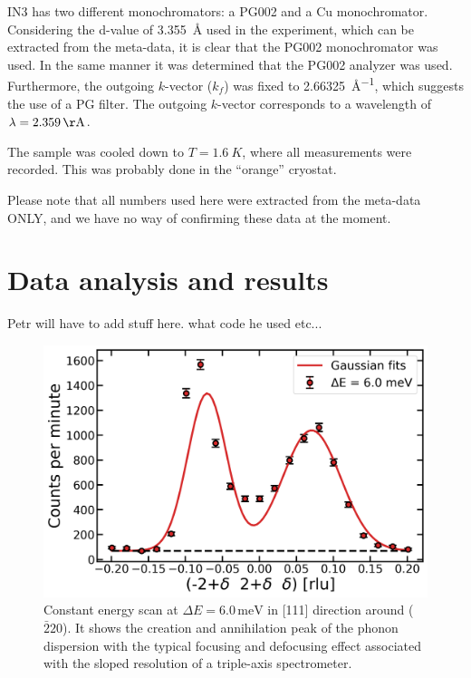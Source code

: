 \documentclass[aps,prx,reprint,amsmath,amssymb,superscriptaddress,showpacs]{revtex4-1}
\begin{document}
IN3 has two different monochromators: a PG002 and a Cu monochromator.
Considering the d-value of \SI{3.355}{\AA} used in the experiment, which can be extracted from the meta-data, it is clear that the PG002 monochromator was used.
In the same manner it was determined that the PG002 analyzer was used. 
Furthermore, the outgoing $k$-vector ($k_f$) was fixed to \SI{2.66325}{\AA^{-1}}, which suggests the use of a PG filter. 
The outgoing $k$-vector corresponds to a wavelength of $\lambda=\SI{2.359}{\AA}$.

The sample was cooled down to $T = \SI{1.6}{K}$, where all measurements were recorded. 
This was probably done in the ``orange'' cryostat.




Please note that all numbers used here were extracted from the meta-data ONLY, and we have no way of confirming these data at the moment. 


\section{Data analysis and results}

Petr will have to add stuff here. what code he used etc...

\begin{figure}
    \includegraphics[width=1.0\linewidth]{mini-school-si-cescan.png}
    \caption{\label{fig1} Constant energy scan at $\Delta E = 6.0\,\mathrm{meV}$ in [111] direction around ($\bar{2}20$). It shows the creation and annihilation peak of the phonon dispersion with the typical focusing and defocusing effect associated with the sloped resolution of a triple-axis spectrometer.}
\end{figure}
\end{document}
